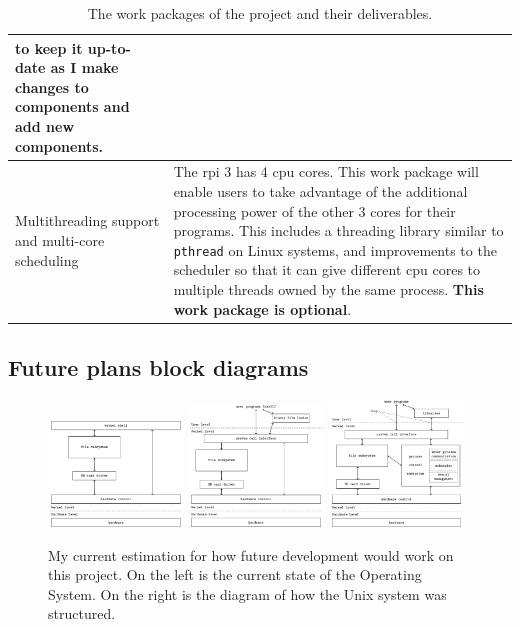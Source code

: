 \documentclass{article}
\begin{document}
\begin{table}[H]
\begin{center}
\begin{tabular}{|p{40mm}|p{115mm}|}
    to keep it up-to-date as I make changes to components and add new
    components.
    \\ \hline
    Multithreading support and multi-core scheduling &
    The \gls{rpi} 3 has 4 \gls{cpu} cores. This work package will enable users
    to take advantage of the additional processing power of the other 3 cores
    for their programs. This includes a threading library similar to
    \texttt{pthread} on Linux systems, and improvements to the scheduler so
    that it can give different \gls{cpu} cores to multiple threads owned by the
    same process. \textbf{This work package is optional}.
    \\ \hline
\end{tabular}
\caption{The work packages of the project and their deliverables.}
\label{tab:original-work-packages}
\end{center}
\end{table}

\clearpage
\subsection{Future plans block diagrams}

\begin{figure}[H]
    \centering
    \includegraphics[width=0.32\textwidth]{build/finished-block-diagram.pdf}
    \includegraphics[width=0.32\textwidth]{build/nextstep-block-diagram.pdf}
    \includegraphics[width=0.32\textwidth]{build/os-block-diagram.pdf}
    \caption{My current estimation for how future development would work on
        this project. On the left is the current state of the Operating System.
        On the right is the diagram of how the Unix system was structured.}
\end{figure}

\printglossaries
\end{document}
